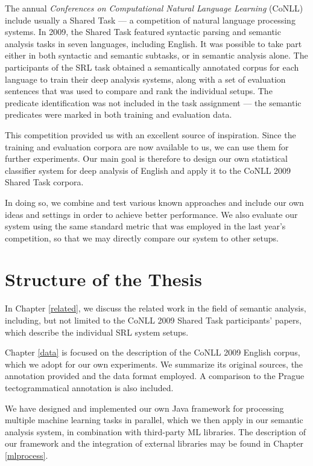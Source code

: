 \documentclass[12pt,notitlepage]{report}
\begin{document}
The annual \emph{Conferences on Computational Natural Language Learning} (CoNLL) include usually a Shared Task --- a competition of natural language processing systems. In 2009, the Shared Task \citep{hajic09} featured syntactic parsing and semantic analysis tasks in seven languages, including English. It was possible to take part either in both syntactic and semantic subtasks, or in semantic analysis alone. The participants of the SRL task obtained a semantically annotated corpus for each language to train their deep analysis systems, along with a set of evaluation sentences that was used to compare and rank the individual setups. The predicate identification was not included in the task assignment --- the semantic predicates were marked in both training and evaluation data.

This competition provided us with an excellent source of inspiration. Since the training and evaluation corpora are now available to us, we can use them for further experiments. Our main goal is therefore to design our own statistical classifier system for deep analysis of English and apply it to the CoNLL 2009 Shared Task corpora. 

In doing so, we combine and test various known approaches and include our own ideas and settings in order to achieve better performance. We also evaluate our system using the same standard metric that was employed in the last year's competition, so that we may directly compare our system to other setups.

\section{Structure of the Thesis}

In Chapter \ref{related}, we discuss the related work in the field of semantic analysis, including, but not limited to the CoNLL 2009 Shared Task participants' papers, which describe the individual SRL system setups.

Chapter \ref{data} is focused on the description of the CoNLL 2009 English corpus, which we adopt for our own experiments. We summarize its original sources, the annotation provided and the data format employed. A comparison to the Prague tectogrammatical annotation \citep{cinkova09} is also included.

We have designed and implemented our own Java framework for processing multiple machine learning tasks in parallel, which we then apply in our semantic analysis system, in combination with third-party ML libraries. The description of our framework and the integration of external libraries may be found in Chapter \ref{mlprocess}. 
\end{document}
